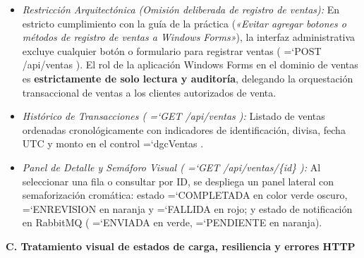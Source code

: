 \documentclass[11pt,a4paper]{article}
\renewcommand{\_}{\oldunderscore\allowbreak}
\DeclareRobustCommand{\texttt}[1]{%
  {\upshape\ttfamily\fontsize{9}{10.8}\selectfont\hyphenchar\font=`\-\relax #1}%
}
\begin{document}
\begin{enumerate}[leftmargin=*,itemsep=2pt,topsep=1pt]
\begin{itemize}[leftmargin=*,itemsep=1pt]
    \item \textit{Restricción Arquitectónica (Omisión deliberada de registro de ventas):} En estricto cumplimiento con la guía de la práctica (\textit{«Evitar agregar botones o métodos de registro de ventas a Windows Forms»}), la interfaz administrativa excluye cualquier botón o formulario para registrar ventas (\texttt{POST /\allowbreak{}api/\allowbreak{}ventas}). El rol de la aplicación Windows Forms en el dominio de ventas es \textbf{estrictamente de solo lectura y auditoría}, delegando la orquestación transaccional de ventas a los clientes autorizados de venta.
    \item \textit{Histórico de Transacciones (\texttt{GET /\allowbreak{}api/\allowbreak{}ventas}):} Listado de ventas ordenadas cronológicamente con indicadores de identificación, divisa, fecha UTC y monto en el control \texttt{dgcVentas}.
    \item \textit{Panel de Detalle y Semáforo Visual (\texttt{GET /\allowbreak{}api/\allowbreak{}ventas/\allowbreak{}\{id\}}):} Al seleccionar una fila o consultar por ID, se despliega un panel lateral con semaforización cromática: estado \texttt{COMPLETADA} en color verde oscuro, \texttt{EN\_REVISION} en naranja y \texttt{FALLIDA} en rojo; y estado de notificación en RabbitMQ (\texttt{ENVIADA} en verde, \texttt{PENDIENTE} en naranja).
  \end{itemize}
\end{enumerate}

\vspace{0.2cm}
\noindent\textbf{C. Tratamiento visual de estados de carga, resiliencia y errores HTTP}
\end{document}
